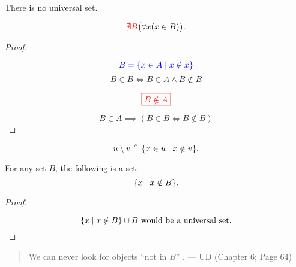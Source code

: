 \begin{frame}{}
  \begin{theorem}
    There is no universal set.

    \[
      \textcolor{red}{\nexists B} \big(\forall x (x \in B) \big).
    \]
  \end{theorem}

  \pause
  \begin{proof}
    \begin{center}
    \end{center}

    \pause
    \[
      \textcolor{blue}{B = \{x \in A \mid x \notin x\}}
    \]
    \pause
    \vspace{-0.30cm}
    \[
      B \in B \iff B \in A \land B \notin B
    \]

    \pause
    \[
      \textcolor{red}{\boxed{B \notin A}}
    \]

    \pause
    \vspace{-0.30cm}
    \[
      B \in A \implies (B \in B \iff B \notin B)
    \]
  \end{proof}
\end{frame}

\begin{frame}{}
  \begin{definition}
    \[
      u \setminus v \triangleq \{x \in u \mid x \notin v\}.
    \]
  \end{definition}

  \pause
  \begin{theorem}
    For any set $B$, the following is  a set:
    \[
      \{x \mid x \notin B\}.
    \]
  \end{theorem}

  \pause
  \begin{proof}
    \begin{center}
    \end{center}

    \pause
    \vspace{-0.50cm}
    \[
      \{x \mid x \notin B\} \cup B \text{ would be a universal set}.
    \]
  \end{proof}

  \pause
  \begin{quote}
    We can never look for objects ``not in $B$'' .
    \hfill --- UD (Chapter 6; Page 64)
  \end{quote}
\end{frame}

